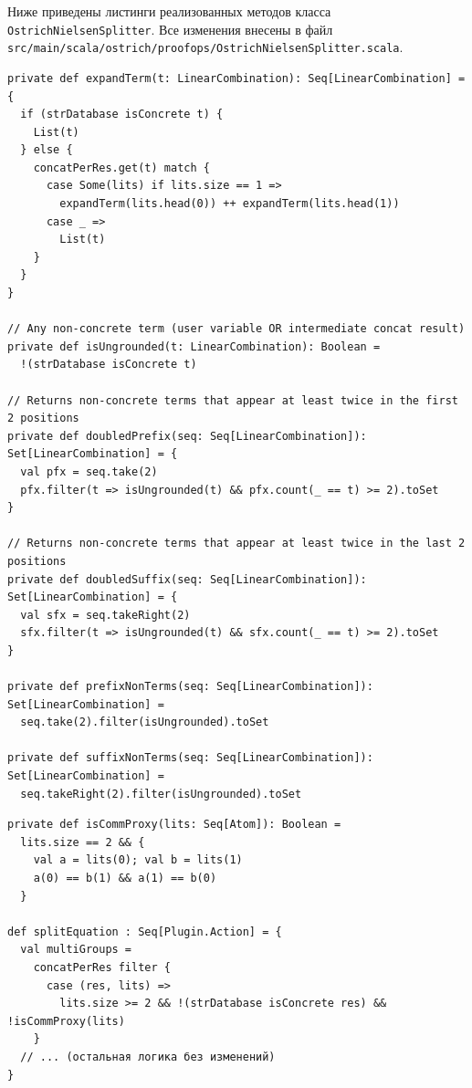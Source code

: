 \documentclass[14pt, russian]{scrartcl}
\begin{document}
Ниже приведены листинги реализованных методов класса
\texttt{OstrichNielsenSplitter}. Все изменения внесены в файл\\
\texttt{src/main/scala/ostrich/proofops/OstrichNielsenSplitter.scala}.


\newpage
\begin{listing}[H]
\caption{Разворачивание конкатенации в плоский список листовых термов}
\label{lst:expand}
\begin{verbatim}
private def expandTerm(t: LinearCombination): Seq[LinearCombination] = {
  if (strDatabase isConcrete t) {
    List(t)
  } else {
    concatPerRes.get(t) match {
      case Some(lits) if lits.size == 1 =>
        expandTerm(lits.head(0)) ++ expandTerm(lits.head(1))
      case _ =>
        List(t)
    }
  }
}

// Any non-concrete term (user variable OR intermediate concat result)
private def isUngrounded(t: LinearCombination): Boolean =
  !(strDatabase isConcrete t)

// Returns non-concrete terms that appear at least twice in the first 2 positions
private def doubledPrefix(seq: Seq[LinearCombination]): Set[LinearCombination] = {
  val pfx = seq.take(2)
  pfx.filter(t => isUngrounded(t) && pfx.count(_ == t) >= 2).toSet
}

// Returns non-concrete terms that appear at least twice in the last 2 positions
private def doubledSuffix(seq: Seq[LinearCombination]): Set[LinearCombination] = {
  val sfx = seq.takeRight(2)
  sfx.filter(t => isUngrounded(t) && sfx.count(_ == t) >= 2).toSet
}

private def prefixNonTerms(seq: Seq[LinearCombination]): Set[LinearCombination] =
  seq.take(2).filter(isUngrounded).toSet

private def suffixNonTerms(seq: Seq[LinearCombination]): Set[LinearCombination] =
  seq.takeRight(2).filter(isUngrounded).toSet
\end{verbatim}
\end{listing}


\newpage
\begin{listing}[H]
\caption{Предикат \texttt{isCommProxy} и его использование в \texttt{splitEquation}}
\label{lst:proxy}
\begin{verbatim}
private def isCommProxy(lits: Seq[Atom]): Boolean =
  lits.size == 2 && {
    val a = lits(0); val b = lits(1)
    a(0) == b(1) && a(1) == b(0)
  }

def splitEquation : Seq[Plugin.Action] = {
  val multiGroups =
    concatPerRes filter {
      case (res, lits) =>
        lits.size >= 2 && !(strDatabase isConcrete res) && !isCommProxy(lits)
    }
  // ... (остальная логика без изменений)
}
\end{verbatim}
\end{listing}
\end{document}
